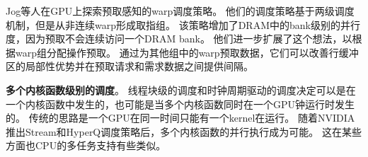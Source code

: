 Jog等人在GPU上探索预取感知的warp调度策略。
他们的调度策略基于两级调度机制，但是从非连续warp形成取指组。 
该策略增加了DRAM中的bank级别的并行度，因为预取不会连续访问一个DRAM bank。 
他们进一步扩展了这个想法，以根据warp组分配操作预取。 
通过为其他组中的warp预取数据，它们可以改善行缓冲区的局部性优势并在预取请求和需求数据之间提供间隔。


\textbf{多个内核函数级别的调度}。
线程块级的调度和时钟周期驱动的调度决定可以是在一个内核函数中发生的，也可能是当多个内核函数同时在一个GPU钟运行时发生的。
传统的思路是一个GPU在同一时间只能有一个kernel在运行。
随着NVIDIA推出Stream和HyperQ调度策略后，多个内核函数的并行执行成为可能。
这在某些方面也CPU的多任务支持有些类似。



 




















